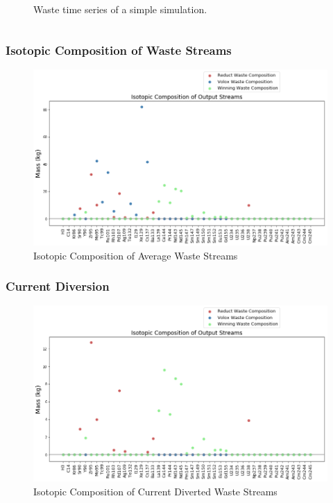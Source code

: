 \begin{frame}
\begin{columns}
\begin{column}{.5\textwidth}
\begin{figure}
			\caption{Waste time series of a simple simulation.}
			\label{fig:timeseries-waste}
		\end{figure}
	\end{column}
\end{columns} 
\end{frame}

\begin{frame}
\frametitle{Isotopic Composition of Waste Streams}
  \begin{figure}
  	\centering
  	\includegraphics[width=0.9\linewidth]{avg-isotope-comp}
  	\caption{Isotopic Composition of Average Waste Streams}
  	\label{fig:avg-isotope-comp}
  \end{figure}
\end{frame}

\begin{frame}
\frametitle{Current Diversion}
  \begin{figure}
  	\centering
  	\includegraphics[width=0.9\linewidth]{current-isotope-comp}
  	\caption{Isotopic Composition of Current Diverted Waste Streams}
  	\label{fig:current-isotope-comp}
  \end{figure}
\end{frame}

